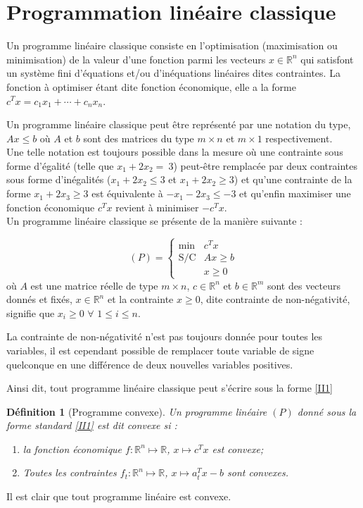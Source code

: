 \documentclass[11pt]{report}
\newenvironment{boxdefinition}
{\begin{tcolorbox}
		[enhanced jigsaw,breakable,pad at break*=1mm,
		colback=black!5!white,boxrule=0pt,frame hidden,
		borderline west={1.5mm}{-2mm}{blue}]}
	{\end{tcolorbox}}
\theoremstyle{styletheorem}
\theoremstyle{styledef}
\newtheorem{definitions}[theoreme]{Définition}
\theoremstyle{remark}
\newenvironment{definition}{\vspace*{0.3cm}\begin{boxdefinition}\begin{definitions}}{\end{definitions}\end{boxdefinition}\vspace*{0.3cm}}
\newcommand{\R}{\ensuremath{\mathbb{R}}}
\begin{document}
\section{Programmation linéaire classique}
Un programme linéaire classique consiste en l'optimisation (maximisation ou minimisation) de la valeur d'une fonction  parmi les vecteurs $x \in  \R^n$ qui satisfont un système fini d'équations et/ou d'inéquations linéaires dites contraintes. La fonction à optimiser étant dite fonction économique, elle a la forme $c^T x = c_1x_1+\cdots+c_nx_n$.

Un programme linéaire classique peut être représenté par une notation du type, $Ax \leq b$ où $A$ et $b$ sont des matrices du type $m\times n$ et $m\times 1$ respectivement.\\
Une telle notation est toujours possible dans la mesure où une contrainte sous forme d'égalité (telle que $x_1+2x_2 =~3$) peut-être remplacée  par deux contraintes sous forme d'inégalités ($x_1+2x_2 \leq 3$ et $x_1+2x_2 \geq 3$) et qu'une contrainte de la  forme $x_1+2x_3 \geq3$ est équivalente à  $-x_1-2x_3 \leq -3$ et qu'enfin maximiser une fonction économique $c^Tx$ revient à minimiser $-c^T x$.\\
Un programme linéaire classique se présente de la manière suivante : 

\begin{equation}\label{II1}
	(P) = \left \lbrace \begin{array}{ll}
		\text{min}& c^Tx\\
		\text{S/C} & Ax\geq b\\
		& x\geq 0
	\end{array}\right.
\end{equation}
où $A$ est une matrice réelle de type $m\times n$, $c \in \R^n$ et $b \in \R^m$ sont des vecteurs donnés et fixés, $x \in \R^n$ et la contrainte $x \geq 0$, dite contrainte de non-négativité, signifie que $x_i \geq 0$ $\forall$ $1 \leq i \leq n$.

La contrainte de non-négativité n'est pas toujours donnée pour toutes les variables, il est cependant possible de remplacer toute variable de signe quelconque en une différence de deux nouvelles variables positives.

Ainsi dit, tout programme linéaire classique peut s'écrire sous la forme \ref{II1} \cite{b1}
\begin{definition}[Programme convexe]
	Un programme linéaire $(P)$ donné sous la forme standard \ref{II1} est dit convexe si :
	\begin{enumerate}[label=$\bullet$]
		\item la fonction économique $f \colon \R^n \mapsto \R$, $x \longmapsto c^T x$ est convexe;
		
		\item Toutes les contraintes $f_t \colon \R^n \mapsto \R$, $x \longmapsto  a_t^T x -b$ sont convexes.
	\end{enumerate}
\end{definition}
Il est clair que tout programme linéaire est convexe.
\end{document}
